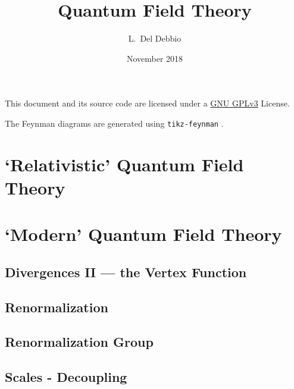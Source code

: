 \documentclass[bibliography=totoc]{notes}
\title{Quantum Field Theory}
\author{L.~Del Debbio}
\date{November 2018}
\begin{document}
%
\maketitle
\clearpage
\tableofcontents

\vspace{\fill}

This document and its source code are licensed under a \href{https://www.gnu.org/licenses/gpl-3.0.en.html}{GNU GPLv3} License.

The Feynman diagrams are generated using \texttt{tikz-feynman} \parencite{ELLIS2017103}.

\nocite{*}
\printbibliography[keyword=recommended,title={Recommended Textbooks},omitnumbers=true]



\part{`Relativistic' Quantum Field Theory}
\label{part:RQFT}




\part{`Modern' Quantum Field Theory}
\label{part:MQFT}



%






\chapter{Divergences II --- the Vertex Function}
\label{cha:diverg-ii-vert}


\chapter{Renormalization}
\label{cha:renormalization}
% 


\chapter{Renormalization Group}
\label{cha:renorm-group}

\chapter{Scales - Decoupling}
\label{cha:scales-decoupling}

\printindex
\printbibliography[notkeyword=recommended]
\end{document}
